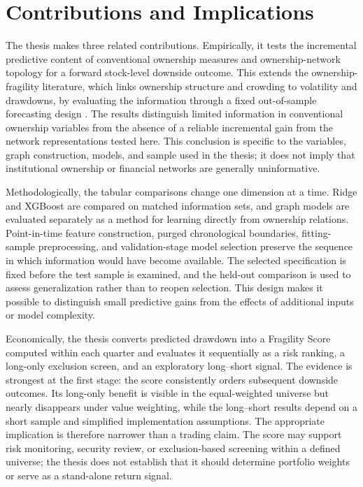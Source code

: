\section{Contributions and Implications}
\label{sec:contributions}

The thesis makes three related contributions. Empirically, it tests the incremental predictive content of conventional ownership measures and ownership-network topology for a forward stock-level downside outcome. This extends the ownership-fragility literature, which links ownership structure and crowding to volatility and drawdowns, by evaluating the information through a fixed out-of-sample forecasting design \parencite{greenwood2011stock,brown2022crowded}. The results distinguish limited information in conventional ownership variables from the absence of a reliable incremental gain from the network representations tested here. This conclusion is specific to the variables, graph construction, models, and sample used in the thesis; it does not imply that institutional ownership or financial networks are generally uninformative.

Methodologically, the tabular comparisons change one dimension at a time. Ridge and XGBoost are compared on matched information sets, and graph models are evaluated separately as a method for learning directly from ownership relations. Point-in-time feature construction, purged chronological boundaries, fitting-sample preprocessing, and validation-stage model selection preserve the sequence in which information would have become available. The selected specification is fixed before the test sample is examined, and the held-out comparison is used to assess generalization rather than to reopen selection. This design makes it possible to distinguish small predictive gains from the effects of additional inputs or model complexity.

Economically, the thesis converts predicted drawdown into a Fragility Score computed within each quarter and evaluates it sequentially as a risk ranking, a long-only exclusion screen, and an exploratory long--short signal. The evidence is strongest at the first stage: the score consistently orders subsequent downside outcomes. Its long-only benefit is visible in the equal-weighted universe but nearly disappears under value weighting, while the long--short results depend on a short sample and simplified implementation assumptions. The appropriate implication is therefore narrower than a trading claim. The score may support risk monitoring, security review, or exclusion-based screening within a defined universe; the thesis does not establish that it should determine portfolio weights or serve as a stand-alone return signal.
